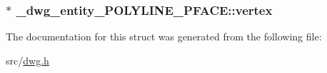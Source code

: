 \hypertarget{struct__dwg__entity__POLYLINE__PFACE_a3569d10bd03207d404091066ae059dbd}{
\subsubsection[{vertex}]{$\ast$ {\bf \-\_\-dwg\-\_\-entity\-\_\-\-P\-O\-L\-Y\-L\-I\-N\-E\-\_\-\-P\-F\-A\-C\-E\-::vertex}}}\label{struct__dwg__entity__POLYLINE__PFACE_a3569d10bd03207d404091066ae059dbd}


\-The documentation for this struct was generated from the following file\-:\begin{DoxyCompactItemize}
\item 
src/\hyperlink{dwg_8h}{dwg.\-h}\end{DoxyCompactItemize}
